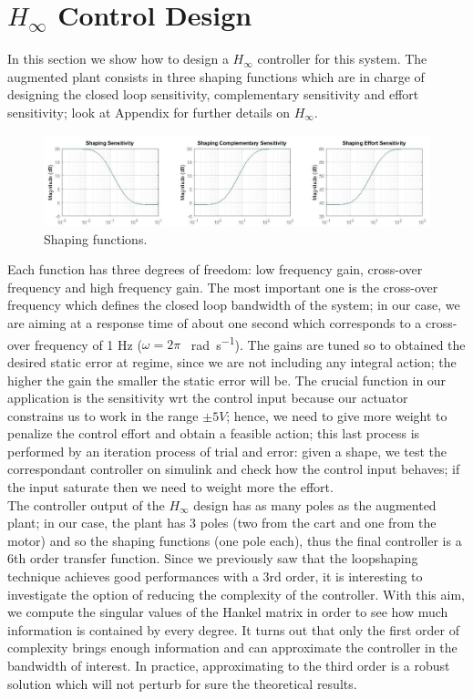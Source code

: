 \section{$H_{\infty}$ Control Design}
In this section we show how to design a $H_{\infty}$ controller for this system. The augmented plant consists in three shaping functions which are in charge of designing the closed loop sensitivity, complementary sensitivity and effort sensitivity; look at Appendix for further details on $H_\infty$.\\

\begin{figure}[h]
	\setlength{\belowcaptionskip}{-10pt}
	\centering
	\includegraphics[scale=0.5]{img/hinf_shapes.jpg}
	\caption{Shaping functions.}
\end{figure}

Each function has three degrees of freedom: low frequency gain, cross-over frequency and high frequency gain. The most important one is the cross-over frequency which defines the closed loop bandwidth of the system; in our case, we are aiming at a response time of about one second which corresponds to a cross-over frequency of 1 Hz ($\omega =2\pi $ \SI{}{\radian \per \second}). The gains are tuned so to obtained the desired static error at regime, since we are not including any integral action; the higher the gain the smaller the static error will be. The crucial function in our application is the sensitivity wrt the control input because our actuator constrains us to work in the range $\pm 5V$; hence, we need to give more weight to penalize the control effort and obtain a feasible action; this last process is performed by an iteration process of trial and error: given a shape, we test the correspondant controller on simulink and check how the control input behaves; if the input saturate then we need to weight more the effort.\\

The controller output of the $H_{\infty}$ design has as many poles as the augmented plant; in our case, the plant has 3 poles (two from the cart and one from the motor) and so the shaping functions (one pole each), thus the final controller is a 6th order transfer function. Since we previously saw that the loopshaping technique achieves good performances with a 3rd order, it is interesting to investigate the option of reducing the complexity of the controller. With this aim, we compute the singular values of the Hankel matrix in order to see how much information is contained by every degree. It turns out that only the first order of complexity brings enough information and can approximate the controller in the bandwidth of interest. In practice, approximating to the third order is a robust solution which will not perturb for sure the theoretical results.\\

